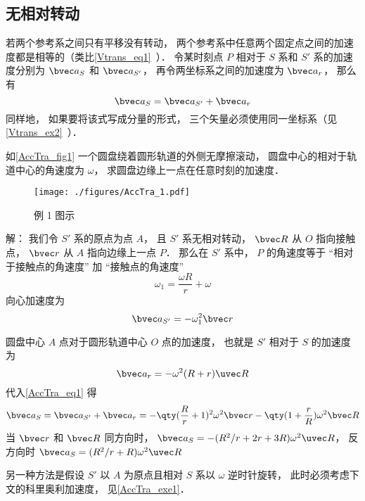 

\subsection{无相对转动}
若两个参考系之间只有平移没有转动， 两个参考系中任意两个固定点之间的加速度都是相等的（类比\autoref{Vtrans_eq1}~）． 令某时刻点 $P$ 相对于 $S$ 系和 $S'$ 系的加速度分别为 $\bvec a_S$ 和 $\bvec a_{S'}$， 再令两坐标系之间的加速度为 $\bvec a_r$， 那么有
\begin{equation}\label{AccTra_eq1}
\bvec a_S = \bvec a_{S'} + \bvec a_r
\end{equation}
同样地， 如果要将该式写成分量的形式， 三个矢量必须使用同一坐标系（见\autoref{Vtrans_ex2}~）．

\begin{example}{}\label{AccTra_ex1}
如\autoref{AccTra_fig1} 一个圆盘绕着圆形轨道的外侧无摩擦滚动， 圆盘中心的相对于轨道中心的角速度为 $\omega$， 求圆盘边缘上一点在任意时刻的加速度．
\begin{figure}[ht]
\centering
\texttt{[image: ./figures/AccTra\_1.pdf]}
\caption{例 1 图示} \label{AccTra_fig1}
\end{figure}

解： 我们令 $S'$ 系的原点为点 $A$， 且 $S'$ 系无相对转动， $\bvec R$ 从 $O$ 指向接触点， $\bvec r$ 从 $A$ 指向边缘上一点 $P$． 那么在 $S'$ 系中， $P$ 的角速度等于 “相对于接触点的角速度” 加 “接触点的角速度”
\begin{equation}
\omega_1 = \frac{\omega R}{r} + \omega
\end{equation}
向心加速度为
\begin{equation}
\bvec a_{S'} = -\omega_1^2 \bvec r
\end{equation}

圆盘中心 $A$ 点对于圆形轨道中心 $O$ 点的加速度， 也就是 $S'$ 相对于 $S$ 的加速度为
\begin{equation}
\bvec a_r = -\omega^2 (R + r)\uvec R
\end{equation}
代入\autoref{AccTra_eq1} 得
\begin{equation}
\bvec a_S = \bvec a_{S'} + \bvec a_r = -\qty(\frac{R}{r} + 1)^2 \omega^2\bvec r - \qty(1 + \frac{r}{R})\omega^2 \bvec R
\end{equation}
当 $\bvec r$ 和 $\bvec R$ 同方向时， $\bvec a_S = -(R^2/r + 2r + 3R)\omega^2 \uvec R$， 反方向时 $\bvec a_S = (R^2/r + R)\omega^2\uvec R$



另一种方法是假设 $S'$ 以 $A$ 为原点且相对 $S$ 系以 $\omega$ 逆时针旋转， 此时必须考虑下文的科里奥利加速度， 见\autoref{AccTra_exe1}．
\end{example}


